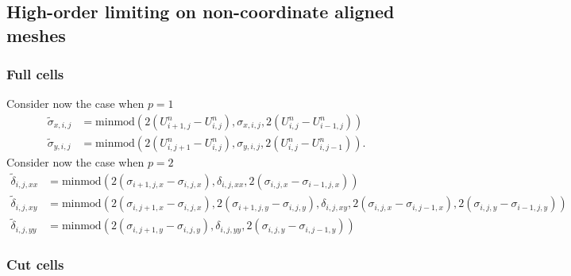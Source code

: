 \subsection{High-order limiting on non-coordinate aligned meshes}
\subsubsection*{Full cells}
Consider now the case when $p=1$
\begin{align*}
\tilde \sigma_{x,i,j} &= \text{minmod}(2( U^n_{i+1,j}- U^n_{i,j}), \sigma_{x,i,j}, 2( U^n_{i,j}- U^n_{i-1,j}))\\
\tilde \sigma_{y,i,j} &= \text{minmod}(2( U^n_{i,j+1}- U^n_{i,j}), \sigma_{y,i,j}, 2( U^n_{i,j}- U^n_{i,j-1})).
\end{align*}
Consider now the case when $p=2$
\begin{align*}
\tilde \delta_{i,j,xx} &= \text{minmod}(2( \sigma_{i+1,j,x}- \sigma_{i,j,x}), \delta_{i,j,xx}, 2( \sigma_{i,j,x}- \sigma_{i-1,j,x}))\\
\tilde \delta_{i,j,xy} &= \text{minmod}(2( \sigma_{i,j+1,x}- \sigma_{i,j,x}),2( \sigma_{i+1,j,y}- \sigma_{i,j,y}), \delta_{i,j,xy}, 2( \sigma_{i,j,x}- \sigma_{i,j-1,x}),2( \sigma_{i,j,y}- \sigma_{i-1,j,y}))\\
\tilde \delta_{i,j,yy} &= \text{minmod}(2( \sigma_{i,j+1,y}- \sigma_{i,j,y}), \delta_{i,j,yy}, 2( \sigma_{i,j,y}- \sigma_{i,j-1,y}))
\end{align*}

\subsubsection*{Cut cells}

